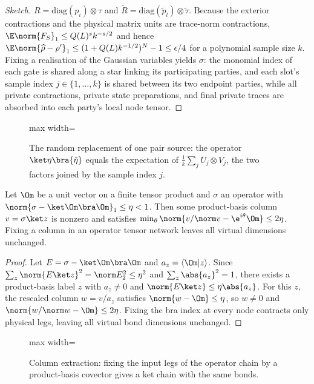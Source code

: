 \begin{proof}[Sketch]
$R=\mathrm{diag}(p_i)\otimes\tau$ and $\widetilde R=\mathrm{diag}(\tilde p_l)\otimes\tilde\tau$.
Because the exterior contractions and the physical matrix units are trace-norm contractions,
$\E\norm{F_S}_1\le Q(L)^sk^{-s/2}$ and hence
$\E\norm{\widehat\rho-\rho'}_1\le(1+Q(L)k^{-1/2})^N-1\le\epsilon/4$ for a
polynomial sample size $k$. Fixing a realisation of the Gaussian variables yields $\sigma$: the monomial
index of each gate is shared along a star linking its participating parties, and each
slot's sample index $j\in\{1,\dots,k\}$ is shared between its two endpoint parties, while all private
contractions, private state preparations, and final private traces are
absorbed into each party's local node tensor.
\end{proof}

\begin{figure}[t]
\centering
\begin{adjustbox}{max width=\linewidth}

\end{adjustbox}
\caption{The random replacement of one pair source: the operator $\ket\eta\bra{\tilde\eta}$ equals the expectation of $\frac1k\sum_j U_j\otimes V_j$, the two factors joined by the sample index $j$.}\label{fig:source-sampling}
\end{figure}

\begin{lemma}\label{lem:column}
Let $\Om$ be a unit vector on a finite tensor product and $\sigma$ an
operator with $\norm{\sigma-\ket\Om\bra\Om}_1\le\eta<1$. Then some
product-basis column $v=\sigma\ket z$ is nonzero and satisfies
$\min_\theta\norm{v/\norm v-\e^{i\theta}\Om}\le2\eta$. Fixing a column in an
operator tensor network leaves all virtual dimensions unchanged.
\end{lemma}
\begin{proof}
Let $E=\sigma-\ket\Om\bra\Om$ and $a_z=\langle\Om|z\rangle$. Since
$\sum_z\norm{E\ket z}^2=\norm E_2^2\le\eta^2$ and $\sum_z\abs{a_z}^2=1$,
there exists a product-basis label $z$ with $a_z\ne0$ and $\norm{E\ket z}\le\eta\abs{a_z}$. For this $z$,
the rescaled column $w=v/a_z$ satisfies $\norm{w-\Om}\le\eta$, so $w\ne0$ and
$\norm{w/\norm w-\Om}\le2\eta$. Fixing the bra index at every node contracts
only physical legs, leaving all virtual bond dimensions unchanged.
\end{proof}

\begin{figure}[t]
\centering
\begin{adjustbox}{max width=\linewidth}

\end{adjustbox}
\caption{Column extraction: fixing the input legs of the operator chain by a product-basis covector gives a ket chain with the same bonds.}\label{fig:column}
\end{figure}

